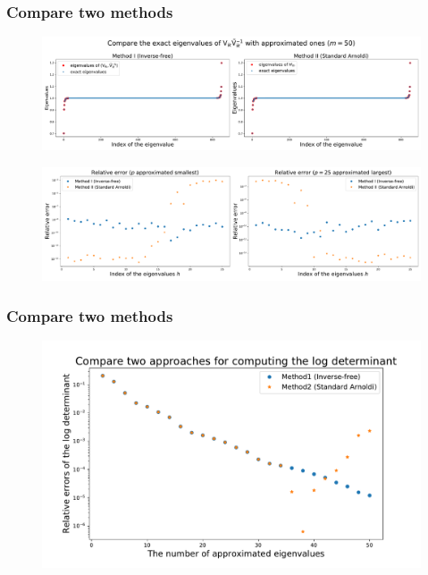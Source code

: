 \documentclass[dvipsnames,10pt]{beamer}
\begin{document}
\begin{frame}
    \frametitle{Compare two methods}
\begin{figure}[H]
    \centering
    \includegraphics[scale = 0.23]{figs/Method_GEP_m_50.pdf}
\end{figure}
\begin{figure}[H]
    \centering
    \includegraphics[scale = 0.23]{figs/rel_err_m_50.pdf}
\end{figure}
\end{frame}
\begin{frame}
    \frametitle{Compare two methods}
\begin{figure}[H]
    \centering
    \includegraphics[scale = 0.45]{figs/compare_two_inv_free_approaches.pdf}
\end{figure}
\end{frame}
\end{document}
